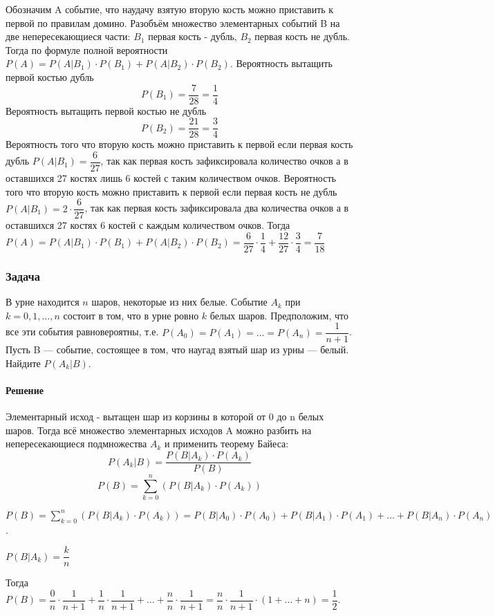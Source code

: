 \documentclass[a4paper,12pt]{article}
\begin{document}
Обозначим A событие, что наудачу взятую вторую кость можно приставить к первой по правилам домино. Разобъём множество элементарных событий B на две непересекающиеся части: \(B_1\) первая кость - дубль, \(B_2\) первая кость не дубль. Тогда по формуле полной вероятности \( P(A) = P(A|B_1) \cdot P(B_1) + P(A|B_2) \cdot P(B_2) \).
Вероятность вытащить первой костью дубль \[ P(B_1) = \dfrac{7}{28}=\dfrac{1}{4} \]
Вероятность вытащить первой костью не дубль \[ P(B_2) = \dfrac{21}{28}=\dfrac{3}{4} \]
Вероятность того что вторую кость можно приставить к первой если первая кость дубль \( P(A|B_1) = \dfrac{6}{27} \), так как первая кость зафиксировала количество очков а в оставшихся 27 костях лишь 6 костей с таким количеством очков. 
Вероятность того что вторую кость можно приставить к первой если первая кость не дубль \( P(A|B_1) = 2\cdot\dfrac{6}{27} \), так как первая кость зафиксировала два количества очков а в оставшихся 27 костях 6 костей с каждым количеством очков.
Тогда \( P(A) = P(A|B_1) \cdot P(B_1) + P(A|B_2) \cdot P(B_2) = \dfrac{6}{27} \cdot \dfrac{1}{4} + \dfrac{12}{27} \cdot \dfrac{3}{4} = \dfrac{7}{18} \)



\subsubsection*{Задача}
В урне находится \(n\) шаров, некоторые из них белые. Событие \(A_k\) при \(k=0,1,…,n\) состоит в том, что в урне ровно \(k\) белых шаров. Предположим, что все эти события равновероятны, т.е. \(P(A_0)=P(A_1)=\ldots=P(A_n)=\dfrac{1}{n+1} \). Пусть B — событие, состоящее в том, что наугад взятый шар из урны — белый. Найдите \( P(A_k|B) \).
\paragraph{Решение}
Элементарный исход - вытащен шар из корзины в которой от 0 до n белых шаров. Тогда всё множество элементарных исходов A можно разбить на непересекающиеся подмножества \(A_k\) и применить теорему Байеса:
\[ P(A_k|B) = \dfrac{P(B|A_k) \cdot P(A_k) }{P(B)} \]
\[ P(B) = \sum_{k=0}^{n} \left(P(B|A_k) \cdot P(A_k)\right) \]


\( P(B) = \sum_{k=0}^{n} \left(P(B|A_k) \cdot P(A_k)\right) = P(B|A_0) \cdot P(A_0) + P(B|A_1) \cdot P(A_1) + \ldots + P(B|A_n) \cdot P(A_n) \). 

\( P(B|A_k) = \dfrac{k}{n} \)

Тогда \( P(B) = \dfrac{0}{n} \cdot \dfrac{1}{n+1} + \dfrac{1}{n} \cdot \dfrac{1}{n+1} + \ldots + \dfrac{n}{n} \cdot \dfrac{1}{n+1} = \dfrac{n}{n} \cdot \dfrac{1}{n+1} \cdot \left( 1+\ldots + n \right) = \dfrac{1}{2} \).
\end{document}
